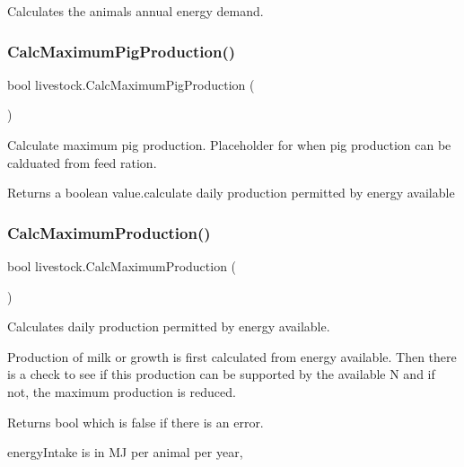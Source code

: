 Calculates the animal\textquotesingle{}s annual energy demand. 

\mbox{\label{classlivestock_a01c291e9fb7f5a9ca29cbadf7bc1be08}} 
\subsubsection{\texorpdfstring{CalcMaximumPigProduction()}{CalcMaximumPigProduction()}}
{\footnotesize\ttfamily bool livestock.\+Calc\+Maximum\+Pig\+Production (\begin{DoxyParamCaption}{ }\end{DoxyParamCaption})\hspace{0.3cm}{\ttfamily [inline]}}



Calculate maximum pig production. Placeholder for when pig production can be calduated from feed ration. 

\begin{DoxyReturn}{Returns}
a boolean value.\+calculate daily production permitted by energy available 
\end{DoxyReturn}
\mbox{\label{classlivestock_a47d7963fe09dec2dcc05a671433e492a}} 
\subsubsection{\texorpdfstring{CalcMaximumProduction()}{CalcMaximumProduction()}}
{\footnotesize\ttfamily bool livestock.\+Calc\+Maximum\+Production (\begin{DoxyParamCaption}{ }\end{DoxyParamCaption})\hspace{0.3cm}{\ttfamily [inline]}}



Calculates daily production permitted by energy available. 

Production of milk or growth is first calculated from energy available. Then there is a check to see if this production can be supported by the available N and if not, the maximum production is reduced. \begin{DoxyReturn}{Returns}
bool which is false if there is an error. 
\end{DoxyReturn}
energy\+Intake is in MJ per animal per year,

